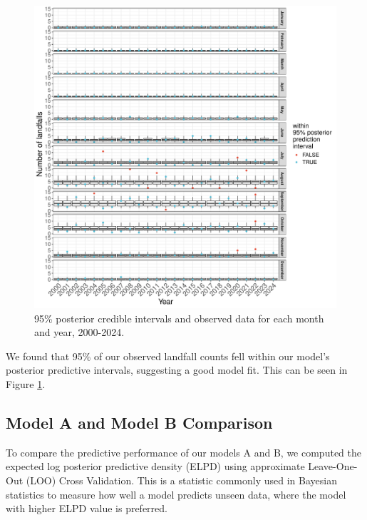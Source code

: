 \documentclass[
]{article}
\begin{document}
\begin{figure}

{\centering \includegraphics[width=1\linewidth]{../outputs/bayesian-analysis-landfall-freq/model-no-year-effect/no-year-post-pred-checks} 

}

\caption{95\% posterior credible intervals and observed data for each month and year, 2000-2024.}\label{fig:figs12}
\end{figure}

We found that 95\% of our observed landfall counts fell within our model's posterior predictive intervals, suggesting a good model fit. This can be seen in Figure \ref{fig:figs12}.

\newpage

\subsection{Model A and Model B Comparison}\label{model-a-and-model-b-comparison}

To compare the predictive performance of our models A and B, we computed the expected log posterior predictive density (ELPD) using approximate Leave-One-Out (LOO) Cross Validation. This is a statistic commonly used in Bayesian statistics to measure how well a model predicts unseen data, where the model with higher ELPD value is preferred.
\end{document}
